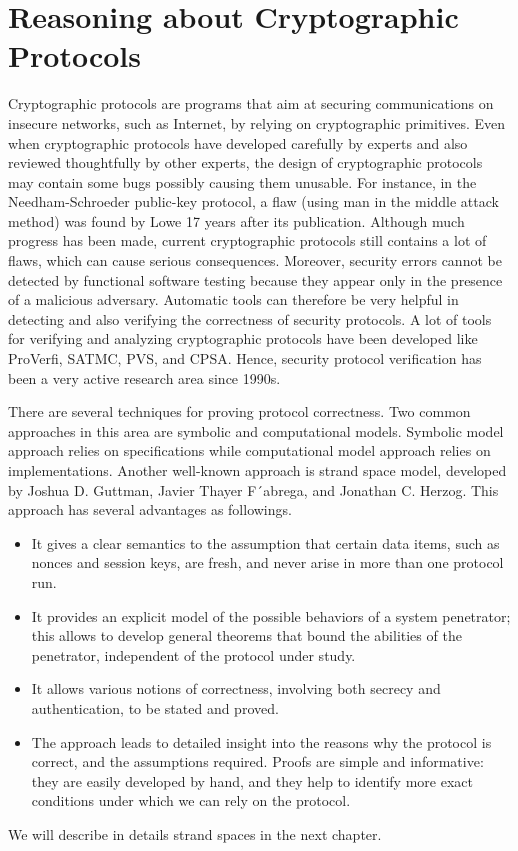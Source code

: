 \section {Reasoning about Cryptographic Protocols}
Cryptographic protocols are programs that aim at securing communications on insecure networks, such as Internet, by relying on cryptographic primitives. Even when cryptographic protocols have developed carefully by experts and also reviewed thoughtfully by other experts, the design of cryptographic protocols may contain some bugs possibly causing them unusable. For instance, in the Needham-Schroeder public-key protocol, a flaw (using man in the middle attack method) was found by Lowe 17 years after its publication. Although much progress has been made, current cryptographic protocols still contains a lot of flaws, which can cause serious consequences. Moreover, security errors cannot be detected by functional software testing because they appear only in the presence of a malicious adversary. Automatic tools can therefore be very helpful in detecting and also verifying the correctness of security protocols.  A lot of tools for verifying and analyzing cryptographic protocols have been developed like ProVerfi, SATMC, PVS, and CPSA. Hence, security protocol verification has been a very active research area since 1990s.

There are several techniques for proving protocol correctness. Two common approaches in this area are symbolic and computational models. Symbolic model approach relies on specifications while computational model approach relies on implementations. Another well-known approach is strand space model, developed by Joshua D. Guttman, Javier Thayer F´abrega, and Jonathan C. Herzog. This approach has several advantages as followings. 
\begin{itemize}
\item It gives a clear semantics to the assumption that certain data
items, such as nonces and session keys, are fresh, and never arise in more
than one protocol run.
\item It provides an explicit model of the possible behaviors of a system
penetrator; this allows to develop general theorems that bound the
abilities of the penetrator, independent of the protocol under study.
\item It allows various notions of correctness, involving both secrecy
and authentication, to be stated and proved.
\item The approach leads to detailed insight into the reasons why
the protocol is correct, and the assumptions required. Proofs are simple
and informative: they are easily developed by hand, and they help to
identify more exact conditions under which we can rely on the protocol.
\end{itemize} We will describe in details strand spaces in the next chapter. %
 
